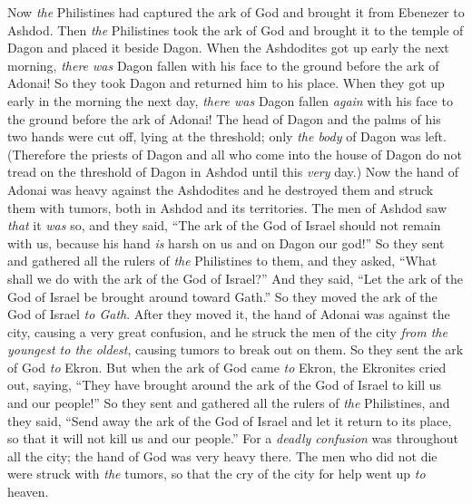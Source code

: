\begin{biblechapter} %
 Now \textit{the} Philistines had captured the ark of God and brought it from Ebenezer to Ashdod.
\verse Then \textit{the} Philistines took the ark of God and brought it to the temple of Dagon and placed it beside Dagon.
\verse When the Ashdodites got up early the next morning, \textit{there was} Dagon fallen with his face to the ground before the ark of Adonai! So they took Dagon and returned him to his place.
\verse When they got up early in the morning the next day, \textit{there was} Dagon fallen \textit{again} with his face to the ground before the ark of Adonai! The head of Dagon and the palms of his two hands were cut off, lying at the threshold; only \textit{the body} of Dagon was left.
\verse (Therefore the priests of Dagon and all who come into the house of Dagon do not tread on the threshold of Dagon in Ashdod until this \textit{very} day.)
\verse Now the hand of Adonai was heavy against the Ashdodites and he destroyed them and struck them with tumors, both in Ashdod and its territories.
\verse The men of Ashdod saw \textit{that} it \textit{was} so, and they said, “The ark of the God of Israel should not remain with us, because his hand \textit{is} harsh on us and on Dagon our god!”
\verse So they sent and gathered all the rulers of \textit{the} Philistines to them, and they asked, “What shall we do with the ark of the God of Israel?” And they said, “Let the ark of the God of Israel be brought around toward Gath.” So they moved the ark of the God of Israel \textit{to Gath}.
\verse After they moved it, the hand of Adonai was against the city, causing a very great confusion, and he struck the men of the city \textit{from the youngest to the oldest}, causing tumors to break out on them.
\verse So they sent the ark of God \textit{to} Ekron. But when the ark of God came \textit{to} Ekron, the Ekronites cried out, saying, “They have brought around the ark of the God of Israel to kill us and our people!”
\verse So they sent and gathered all the rulers of \textit{the} Philistines, and they said, “Send away the ark of the God of Israel and let it return to its place, so that it will not kill us and our people.” For a \textit{deadly confusion} was throughout all the city; the hand of God was very heavy there.
\verse The men who did not die were struck with \textit{the} tumors, so that the cry of the city for help went up \textit{to} heaven.
\end{biblechapter}

